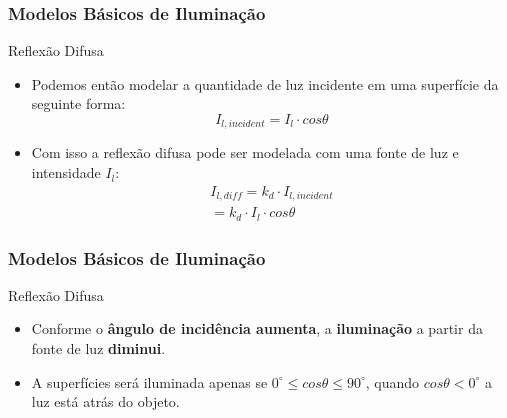 \documentclass{beamer}
\begin{document}
\begin{frame}
\frametitle{Modelos Básicos de Iluminação}

	\begin{block}{Reflexão Difusa}
		\begin{itemize}
			\item Podemos então modelar a quantidade de luz incidente em uma superfície da seguinte forma:
			\begin{equation*}
				I_{l,incident} = I_l \cdot cos \theta
			\end{equation*}
			\item Com isso a reflexão difusa pode ser modelada com uma fonte de luz e intensidade $I_l$:
			\begin{eqnarray*}
				I_{l,diff} = k_d \cdot I_{l,incident} \\
				 = k_d \cdot I_l \cdot cos \theta
			\end{eqnarray*}
		\end{itemize}
	\end{block}
\end{frame}


\begin{frame}
\frametitle{Modelos Básicos de Iluminação}

	\begin{block}{Reflexão Difusa}
		\begin{itemize}
			\item Conforme o \textbf{ângulo de incidência aumenta}, a \textbf{iluminação} a partir da fonte de luz \textbf{diminui}.
			\item A superfícies será iluminada apenas se $0^\circ \leq cos \theta \leq 90^\circ$, quando $cos \theta < 0^\circ$ a luz está atrás do objeto.
		\end{itemize}
	\end{block}
\end{frame}
\end{document}
